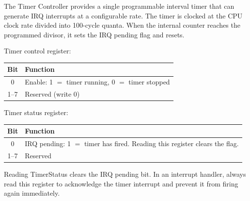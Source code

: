 The Timer Controller provides a single programmable interval timer that can
generate IRQ interrupts at a configurable rate.  The timer is clocked at
the CPU clock rate divided into 100-cycle quanta.  When the internal counter
reaches the programmed divisor, it sets the IRQ pending flag and resets.



Timer control register:


\begin{center}
\small
\begin{tabular}{@{}cl@{}}
\toprule
\textbf{Bit} & \textbf{Function} \\
\midrule
0 & Enable: 1 $=$ timer running, 0 $=$ timer stopped \\
1--7 & Reserved (write 0) \\
\bottomrule
\end{tabular}
\end{center}



Timer status register:


\begin{center}
\small
\begin{tabular}{@{}cl@{}}
\toprule
\textbf{Bit} & \textbf{Function} \\
\midrule
0 & IRQ pending: 1 $=$ timer has fired.  Reading this register clears
    the flag. \\
1--7 & Reserved \\
\bottomrule
\end{tabular}
\end{center}

\begin{notebox}
Reading TimerStatus clears the IRQ pending bit.  In an interrupt handler,
always read this register to acknowledge the timer interrupt and prevent
it from firing again immediately.
\end{notebox}



